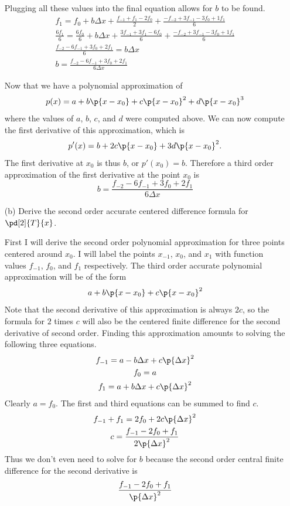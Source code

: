 \documentclass[11pt, oneside]{article}
\begin{document}
\begin{enumerate}
      Plugging all these values into the final equation allows for $b$ to be
      found.
      \begin{gather*}
        f_1 = f_0 + b \Delta x + \frac{f_{-1} + f_1 - 2 f_0}{2} + \frac{-f_{-2} + 3 f_{-1} - 3 f_0 + 1 f_1}{6} \\
        \frac{6f_1}{6} = \frac{6f_0}{6} + b \Delta x + \frac{3f_{-1} + 3f_1 - 6 f_0}{6} + \frac{-f_{-2} + 3 f_{-1} - 3 f_0 + 1 f_1}{6} \\
        \frac{f_{-2} - 6f_{-1} + 3f_0 + 2f_1}{6} =  b \Delta x \\
        b = \frac{f_{-2} - 6f_{-1} + 3f_0 + 2f_1}{6\Delta x}
      \end{gather*}

      Now that we have a polynomial approximation of
      \[
        p(x) = a + b\p{x - x_0} + c\p{x - x_0}^2 + d \p{x - x_0}^3
      \]
      where the values of $a$, $b$, $c$, and $d$ were computed above.
      We can now compute the first derivative of this approximation, which is
      \[
        p'(x) = b + 2c \p{x - x_0} + 3 d\p{x - x_0}^2.
      \]
      The first derivative at $x_0$ is thus $b$, or $p'(x_0) = b$.
      Therefore a third order approximation of the first derivative at the
      point $x_0$ is
      \[
        b = \frac{f_{-2} - 6f_{-1} + 3f_0 + 2f_1}{6\Delta x}
      \]

    \item[(b)] %
      Derive the second order accurate centered difference formula for
      $\pd[2]{T}{x}$.

      First I will derive the second order polynomial approximation for
      three points centered around $x_0$.
      I will label the points $x_{-1}$, $x_0$, and $x_1$ with function values
      $f_{-1}$, $f_0$, and $f_1$ respectively.
      The third order accurate polynomial approximation will be of the form
      \[
        a + b \p{x - x_0} + c \p{x - x_0}^2
      \]
      Note that the second derivative of this approximation is always $2c$, so
      the formula for $2$ times $c$ will also be the centered finite difference for the
      second derivative of second order.
      Finding this approximation amounts to solving the following three equations.
      \begin{gather*}
        f_{-1} = a - b \Delta x + c \p{\Delta x}^2 \\
        f_0 = a \\
        f_1 = a + b \Delta x + c \p{\Delta x}^2
      \end{gather*}
      Clearly $a = f_0$.
      The first and third equations can be summed to find $c$.
      \begin{gather*}
        f_{-1} + f_1 = 2f_0 + 2 c \p{\Delta x}^2 \\
        c = \frac{f_{-1} - 2f_0 + f_1}{2 \p{\Delta x}^2}
      \end{gather*}
      Thus we don't even need to solve for $b$ because the second order 
      central finite difference for the second derivative is
      \[
        \frac{f_{-1} - 2f_0 + f_1}{\p{\Delta x}^2}
      \]


\end{enumerate}
\end{document}

